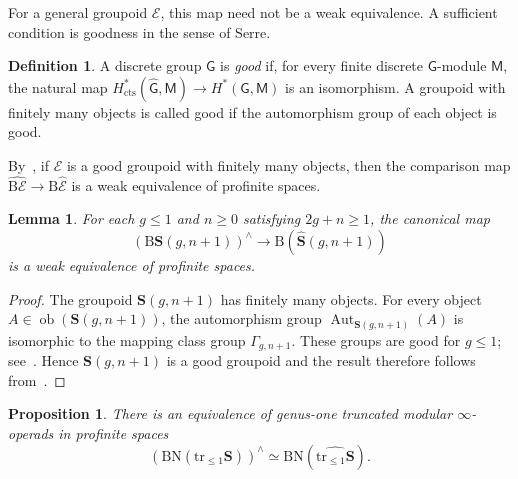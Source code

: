 \documentclass{amsart}
\newcommand{\bS}{\mathbf{S}}
\newcommand{\widesthat}[1]{(#1)^{\wedge}}
\newcommand{\cs}{\mathrm{B}}
\newcommand{\nerve}{\mathrm{N}}
\newcommand{\ob}{\operatorname{ob}}
\newcommand{\Aut}{\operatorname{Aut}}
\newcommand{\trun}[1]{\mathrm{tr}_{\leq{#1}}}
\newtheorem{prop}[theorem]{Proposition}%
\newtheorem{lemma}[theorem]{Lemma}%
\theoremstyle{definition}
\newtheorem{definition}[theorem]{Definition}%
\numberwithin{equation}{section}
\begin{document}
For a general groupoid $\mathscr E$, this map need not be a weak equivalence. A sufficient condition is goodness in the sense of Serre.

\begin{definition}\label{def: good groups}
A discrete group $\mathsf G$ is \emph{good} if, for every finite discrete $\mathsf G$-module $\mathsf M$, the natural map $H^*_{\mathrm{cts}}(\widehat{\mathsf G},\mathsf M)\to H^*(\mathsf G,\mathsf M)$ is an isomorphism. A groupoid with finitely many objects is called good if the automorphism group of each object is good.
\end{definition}

By~\cite[Proposition~5.9]{Horel_profinite_groupoids}, if $\mathscr E$ is a good groupoid with finitely many objects, then the comparison map $\widehat{\cs\mathscr E}\to\cs\widehat{\mathscr E}$ is a weak equivalence of profinite spaces.

\begin{lemma}\label{lemma: B of good groupoids commutes with hat}
For each $g\leq 1$ and $n\geq 0$ satisfying $2g+n\geq 1$, the canonical map
\[
\widesthat{\cs\bS(g,n+1)}
\longrightarrow
\cs(\widehat{\bS}(g,n+1))
\]
is a weak equivalence of profinite spaces.
\end{lemma}

\begin{proof}
The groupoid $\bS(g,n+1)$ has finitely many objects. For every object $A\in\ob(\bS(g,n+1))$, the automorphism group $\Aut_{\bS(g,n+1)}(A)$ is isomorphic to the mapping class group $\Gamma_{g,n+1}$. These groups are good for $g\leq 1$; see~\cite[p.~94]{Oda}. Hence $\bS(g,n+1)$ is a good groupoid and the result therefore follows from~\cite[Proposition~5.9]{Horel_profinite_groupoids}.
\end{proof}

\begin{prop}\label{prop: genus-one B N and completion commute}
There is an equivalence of genus-one truncated modular $\infty$-operads in profinite spaces
\[
\widesthat{\cs\nerve(\trun{1}\bS)}\simeq \cs\nerve(\widehat{\trun{1}\bS}).
\]
\end{prop}
\end{document}
